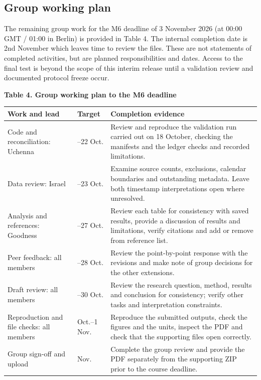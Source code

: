 \documentclass[11pt,a4paper]{article}
\newlength{\tablecontentwidth}
\begin{document}
\subsection*{Group working plan}

The remaining group work for the M6 deadline of 3 November 2026 (at 00:00 GMT / 01:00 in Berlin) is provided in Table 4. The internal completion date is 2nd November which leaves time to review the files. These are not statements of completed activities, but are planned responsibilities and dates. Access to the final test is beyond the scope of this interim release until a validation review and documented protocol freeze occur.

\par\addvspace{8pt}\noindent\begin{minipage}{\linewidth}
\textbf{Table 4. Group working plan to the M6 deadline}\par\vspace{5pt}
\begingroup\fontsize{9.5}{11.7}\selectfont
\renewcommand{\arraystretch}{1.12}
\setlength{\tablecontentwidth}{\dimexpr\linewidth-4\tabcolsep\relax}
\noindent\begin{tabular}{@{}>{\RaggedRight\arraybackslash}p{0.25\tablecontentwidth}>{\RaggedRight\arraybackslash}p{0.17\tablecontentwidth}>{\RaggedRight\arraybackslash}p{0.58\tablecontentwidth}@{}}
\toprule
\textbf{Work and lead} & \textbf{Target} & \textbf{Completion evidence} \\[3pt]
\midrule
Code and reconciliation: Uchenna & 18--22 Oct. & Review and reproduce the validation run carried out on 18 October, checking the manifests and the ledger checks and recorded limitations. \\[3pt]
Data review: Israel & 18--23 Oct. & Examine source counts, exclusions, calendar boundaries and outstanding metadata. Leave both timestamp interpretations open where unresolved. \\[3pt]
Analysis and references: Goodness & 23--27 Oct. & Review each table for consistency with saved results, provide a discussion of results and limitations, verify citations and add or remove from reference list. \\[3pt]
Peer feedback: all members & 22--28 Oct. & Review the point-by-point response with the revisions and make note of group decisions for the other extensions. \\[3pt]
Draft review: all members & 28--30 Oct. & Review the research question, method, results and conclusion for consistency; verify other tasks and interpretation constraints. \\[3pt]
Reproduction and file checks: all members & 31 Oct.--1 Nov. & Reproduce the submitted outputs, check the figures and the units, inspect the PDF and check that the supporting files open correctly. \\[3pt]
Group sign-off and upload & 2 Nov. & Complete the group review and provide the PDF separately from the supporting ZIP prior to the course deadline. \\[3pt]
\bottomrule\end{tabular}
\endgroup
\end{minipage}\par\addvspace{8pt}
\end{document}
